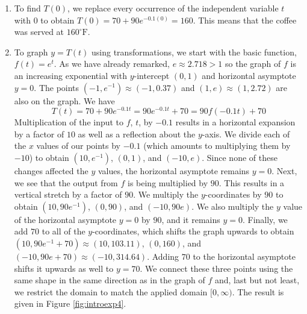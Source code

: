 {
\begin{enumerate}

\item  To find $T(0)$, we replace every occurrence of the independent variable $t$ with $0$ to obtain  $T(0) =70 + 90 e^{-0.1 (0)} = 160$.  This means that the coffee was served at $160^{\circ}\mbox{F}$.

\item  To graph $y = T(t)$ using transformations, we start with the basic function, $f(t)=e^{t}$.  As we have already remarked, $e \approx 2.718 > 1$ so the graph of $f$ is an increasing exponential with $y$-intercept $(0,1)$ and horizontal asymptote $y = 0$.  The points $\left(-1, e^{-1}\right) \approx (-1,0.37)$ and $(1,e) \approx (1,2.72)$ are also on the graph.    We have 
\[
T(t) = 70 + 90e^{-0.1t} = 90e^{-0.1t}+70 = 90 f(-0.1t)+70
\] 
 Multiplication of the input to $f$, $t$, by $-0.1$ results in a horizontal expansion by a factor of $10$ as well as a reflection about the $y$-axis.  We divide each of the $x$ values of our points by $-0.1$ (which amounts to multiplying them by $-10$) to obtain $\left(10,e^{-1}\right)$, $(0,1)$, and $\left(-10, e\right)$.  Since none of these changes affected the $y$ values, the horizontal asymptote remains $y = 0$.  Next, we see that the output from $f$ is being multiplied by $90$.  This results in a vertical stretch by a factor of $90$.  We multiply the $y$-coordinates by $90$ to obtain $\left(10,90e^{-1}\right)$, $(0,90)$, and $\left(-10, 90e\right)$. We also multiply the $y$ value of the horizontal asymptote $y=0$ by $90$, and it remains $y=0$.  Finally, we add $70$ to all of the $y$-coordinates, which shifts the graph upwards to obtain $\left(10,90e^{-1} + 70\right) \approx (10, 103.11)$, $(0,160)$, and $\left(-10, 90e+ 70\right) \approx (-10,314.64)$.  Adding $70$ to the horizontal asymptote shifts it upwards as well to $y=70$.  We connect these three points using the same shape in the same direction as in the graph of $f$ and, last but not least, we restrict the domain to match the applied domain $[0, \infty)$.  The result is given in Figure \ref{fig:introexp4}.  



\end{enumerate}}
